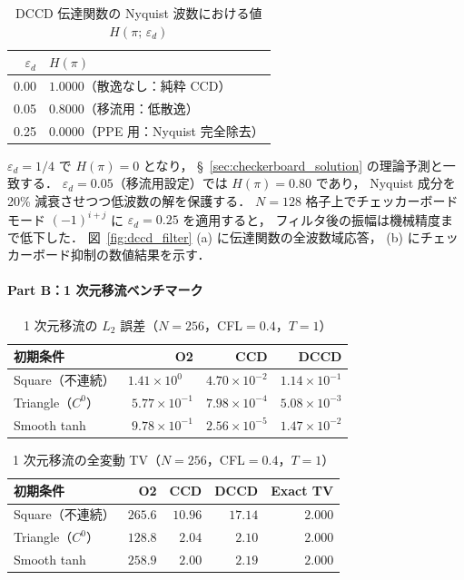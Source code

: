 \begin{table}[htbp]
\centering
\caption{DCCD 伝達関数の Nyquist 波数における値 $H(\pi;\,\varepsilon_d)$}
\label{tab:dccd_transfer}
\renewcommand{\arraystretch}{1.3}
\begin{tabular}{rl}
\toprule
$\varepsilon_d$ & $H(\pi)$ \\
\midrule
0.00 & $1.0000$（散逸なし：純粋 CCD）\\
0.05 & $0.8000$（移流用：低散逸）\\
0.25 & $0.0000$（PPE 用：Nyquist 完全除去）\\
\bottomrule
\end{tabular}
\end{table}

$\varepsilon_d = 1/4$ で $H(\pi) = 0$ となり，
§~\ref{sec:checkerboard_solution} の理論予測と一致する．
$\varepsilon_d = 0.05$（移流用設定）では $H(\pi) = 0.80$ であり，
Nyquist 成分を 20\% 減衰させつつ低波数の解を保護する．
$N = 128$ 格子上でチェッカーボードモード $(-1)^{i+j}$ に $\varepsilon_d = 0.25$ を適用すると，
フィルタ後の振幅は機械精度まで低下した．
図~\ref{fig:dccd_filter} (a) に伝達関数の全波数域応答，
(b) にチェッカーボード抑制の数値結果を示す．

\paragraph{Part B：1 次元移流ベンチマーク}

\begin{table}[htbp]
\centering
\caption{1 次元移流の $L_2$ 誤差（$N=256$，CFL$=0.4$，$T=1$）}
\label{tab:dccd_l2_bench}
\renewcommand{\arraystretch}{1.3}
\begin{tabular}{lrrr}
\toprule
初期条件 & O2 & CCD & DCCD \\
\midrule
Square（不連続） & $1.41\times10^{0\phantom{-}}$ & $4.70\times10^{-2}$ & $1.14\times10^{-1}$ \\
Triangle（$C^0$） & $5.77\times10^{-1}$ & $7.98\times10^{-4}$ & $5.08\times10^{-3}$ \\
Smooth tanh       & $9.78\times10^{-1}$ & $2.56\times10^{-5}$ & $1.47\times10^{-2}$ \\
\bottomrule
\end{tabular}
\end{table}

\begin{table}[htbp]
\centering
\caption{1 次元移流の全変動 TV（$N=256$，CFL$=0.4$，$T=1$）}
\label{tab:dccd_tv_bench}
\renewcommand{\arraystretch}{1.3}
\begin{tabular}{lrrrr}
\toprule
初期条件 & O2 & CCD & DCCD & Exact TV \\
\midrule
Square（不連続） & $265.6$ & $10.96$ & $17.14$ & $2.000$ \\
Triangle（$C^0$） & $128.8$ & $2.04$ & $2.10$ & $2.000$ \\
Smooth tanh       & $258.9$ & $2.00$ & $2.19$ & $2.000$ \\
\bottomrule
\end{tabular}
\end{table}

